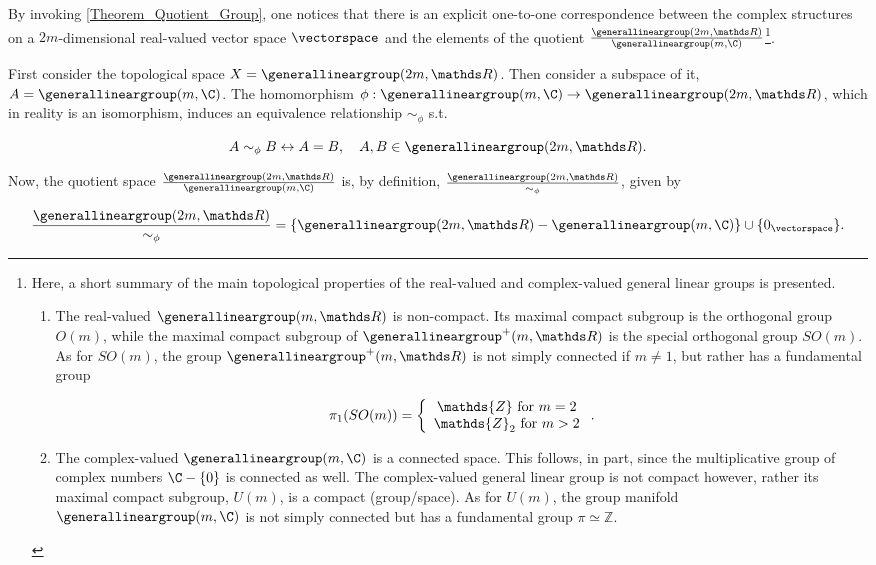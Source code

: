 \documentclass{homework}
\begin{document}
By invoking \cref{Theorem_Quotient_Group}, one notices that there is an 
explicit one-to-one correspondence between the complex structures 
on a  $2m$-dimensional real-valued vector space $\vectorspace$ and the elements of the quotient
$\frac{\generallineargroup(2m, \R)}{\generallineargroup(m, 
\C)}$\footnote{Here, a short summary of the main topological properties of the real-valued and complex-valued general linear groups is presented.

\begin{enumerate}
    \item The real-valued $\generallineargroup(m, \R)$ is non-compact. Its maximal compact subgroup is the orthogonal group $O(m)$, while the maximal compact subgroup of $\generallineargroup^+(m, \R)$ is the special orthogonal group $SO(m)$. As for $SO(m)$, the group  $\generallineargroup^+(m, \R)$ is not simply connected if $m \neq 1$, but rather has a fundamental group
        
        \begin{equation*}
            \pi_1(SO(m)) = \left\{ \begin{array}{cc}
                 \mathds{Z} \textnormal{ for } m = 2 \\
                \mathds{Z}_2 \textnormal{ for } m > 2 
            \end{array}
            \right..
        \end{equation*}
    
    \item The complex-valued $\generallineargroup(m, \C)$ is a connected space. This follows, in part, since the multiplicative group of complex numbers $\C - \{0\}$ is connected as well. The complex-valued general linear group is not compact however, rather its maximal compact subgroup, $U(m)$, is a compact (group/space). As for $U(m)$, the group manifold $\generallineargroup(m, \C)$ is not simply connected but has a fundamental group $\pi \simeq \mathds{Z}$.
\end{enumerate}
}. \medbreak

\begin{remark}
    \textnormal{First consider the topological space }$X = \generallineargroup(2m,\R)$. \textnormal{Then consider a subspace of it, } $A = \generallineargroup(m,\C)$. \textnormal{The homomorphism } $\phi: \generallineargroup(m,\C) \rightarrow \generallineargroup(2m,\R)$, \textnormal{which in reality is an isomorphism, induces an equivalence relationship } $\sim_{\phi}$ s.t. 
    
    $$
        A \sim_{\phi} B \leftrightarrow A = B, \quad A,B \in \generallineargroup(2m,\R).
    $$
    
   \textnormal{Now, the quotient space } $\frac{\generallineargroup(2m,\R)}{\generallineargroup(m,\C)}$ \textnormal{is, by definition, } $\frac{\generallineargroup(2m,\R)}{\sim_{\phi}}$, \textnormal{given by }
    
    \begin{equation}
        \frac{\generallineargroup(2m,\R)}{\sim_{\phi}} = \{\generallineargroup(2m,\R) - \generallineargroup(m,\C)\} \cup \{0_{\vectorspace}\}.
    \end{equation}
\end{remark}
\end{document}
